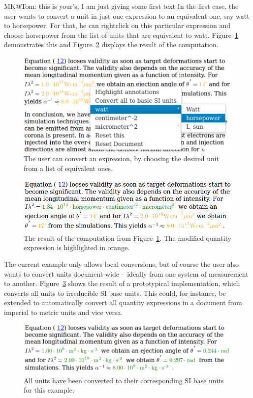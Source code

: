 \begin{newpart}{MK@Tom: this is your's, I am just giving some first text}
In the first case, the user wants to convert a unit in just one expression to
an equivalent one, say watt to horsepower. For that, he can rightclick on this
particular expression and choose horsepower from the list of units that are
equivalent to watt. Figure~\ref{fig:convertone} demonstrates this and
Figure~\ref{fig:convertoneresult} displays the result of the computation. 

\begin{figure}
\includegraphics[scale=0.3]{screenshots/convertone.png}
\caption{The user can convert an expression, by choosing the desired
unit from a list of equivalent ones.}
\label{fig:convertone}
\end{figure}

\begin{figure}
\includegraphics[scale=0.3]{screenshots/convertoneresult.png}
\caption{The result of the computation from Figure~\ref{fig:convertone}. 
The modified quantity expression is highlighted in orange.}
\label{fig:convertoneresult}
\end{figure}

The current example only allows local conversions, but of course the user also wants
to convert units document-wide -- ideally from one system of measurement to another. 
Figure~\ref{fig:si} shows the result of a prototypical implementation, which 
converts all units to irreducible SI base units. 
This could, for instance, be extended to automatically convert all quantity
expressions in a document from imperial to metric units and vice versa. 

\begin{figure}
\includegraphics[scale=0.3]{screenshots/si.png}
\caption{All units have been converted to their corresponding SI base units for this example.}
\label{fig:si}
\end{figure}


\end{newpart}
